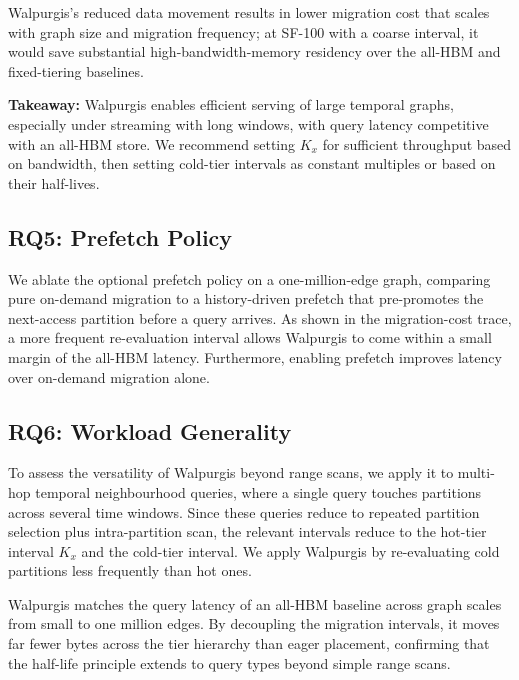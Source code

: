 \documentclass{article}
\begin{document}
Walpurgis's reduced data movement results in lower migration cost that scales with graph
size and migration frequency; at SF-100 with a coarse interval, it would save substantial
high-bandwidth-memory residency over the all-HBM and fixed-tiering baselines.

\textbf{Takeaway:} Walpurgis enables efficient serving of large temporal graphs,
especially under streaming with long windows, with query latency competitive with an
all-HBM store. We recommend setting $K_x$ for sufficient throughput based on bandwidth,
then setting cold-tier intervals as constant multiples or based on their half-lives.

\subsection{RQ5: Prefetch Policy}
\label{sec:rq5}

We ablate the optional prefetch policy on a one-million-edge graph, comparing pure
on-demand migration to a history-driven prefetch that pre-promotes the next-access
partition before a query arrives. As shown in the migration-cost trace, a more frequent
re-evaluation interval allows Walpurgis to come within a small margin of the all-HBM
latency. Furthermore, enabling prefetch improves latency over on-demand migration alone.

\subsection{RQ6: Workload Generality}
\label{sec:rq6}

To assess the versatility of Walpurgis beyond range scans, we apply it to multi-hop
temporal neighbourhood queries, where a single query touches partitions across several
time windows. Since these queries reduce to repeated partition selection plus
intra-partition scan, the relevant intervals reduce to the hot-tier interval $K_x$ and
the cold-tier interval. We apply Walpurgis by re-evaluating cold partitions less
frequently than hot ones.

Walpurgis matches the query latency of an all-HBM baseline across graph scales from small
to one million edges. By decoupling the migration intervals, it moves far fewer bytes
across the tier hierarchy than eager placement, confirming that the half-life principle
extends to query types beyond simple range scans.
\end{document}

